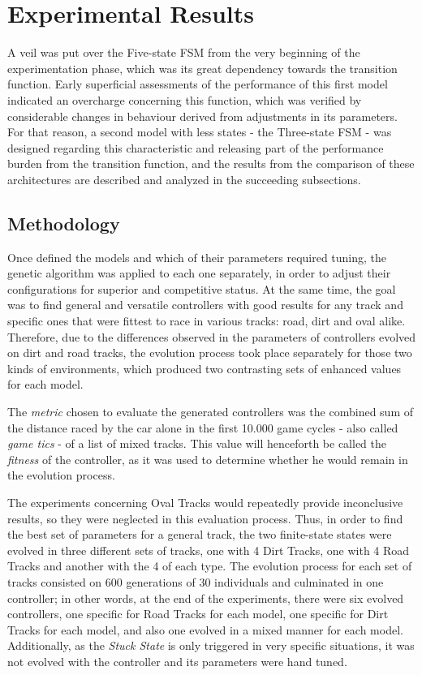 \section{Experimental Results} \label{sec:Experiments}

	A veil was put over the Five-state FSM from the very beginning of the experimentation phase, which was its great
	dependency towards the transition function. Early superficial assessments of the performance of this first model
	indicated an overcharge concerning this function, which was verified by considerable changes in behaviour derived
	from adjustments in its parameters. For that reason, a second model with less states - the Three-state FSM - was
	designed regarding this characteristic and releasing part of the performance burden from the transition function,
	and the results from the comparison of these architectures are described and analyzed in the succeeding
	subsections.

\subsection{Methodology} \label{subsec:Methodology}

	Once defined the models and which of their parameters required tuning, the genetic algorithm was applied to each
	one separately, in order to adjust their configurations for superior and competitive status. At the same time, the
	goal was to find general and versatile controllers with good results for any track and specific ones that were
	fittest to race in various tracks: road, dirt and oval alike. Therefore, due to the differences observed in the
	parameters of controllers evolved on dirt and road tracks, the evolution process took place separately for those
	two kinds of environments, which produced two contrasting sets of enhanced values for each model.
	
	The \emph{metric} chosen to evaluate the generated controllers was the combined sum of the distance raced by the
	car alone in the first 10.000 game cycles - also called \emph{game tics} - of a list of mixed tracks. This value
	will henceforth be called the \emph{fitness} of the controller, as it was used to determine whether he would
	remain in the evolution process.
	
	The experiments concerning Oval Tracks would repeatedly provide inconclusive results, so they were neglected in
	this evaluation process. Thus, in order to find the best set of parameters for a general track, the two
	finite-state states were evolved in three different sets of tracks, one with 4 Dirt Tracks, one with 4 Road
	Tracks and another with the 4 of each type. The evolution process for each set of tracks consisted on 600
	generations of 30 individuals and culminated in one controller; in other words, at the end of the experiments,
	there were six evolved controllers, one specific for Road Tracks for each model, one specific for Dirt Tracks for
	each model, and also one evolved in a mixed manner for each model. Additionally, as the \emph{Stuck State} is only
	triggered in very specific situations, it was not evolved with the controller and its parameters were hand tuned.
	
